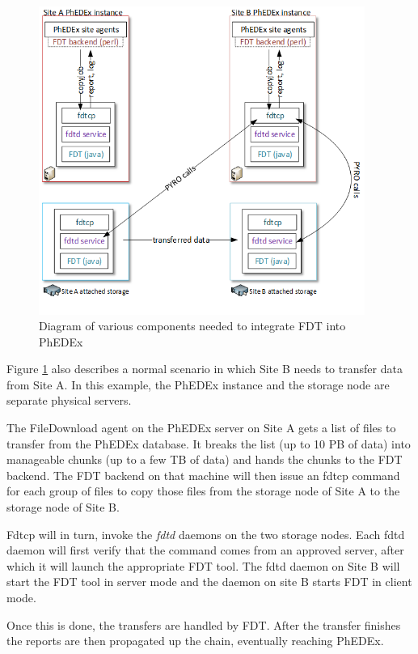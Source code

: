 \begin{figure}[h]
  \centering
  \includegraphics[width=0.95\textwidth]{Figures/PhEDEx-and-FDT-diagram.png}
  \caption{Diagram of various components needed to integrate FDT into PhEDEx}
  \label{fig:PhEDEx-FDT-arch}
\end{figure} 

Figure \ref{fig:PhEDEx-FDT-arch} also describes a normal scenario in which Site B
needs to transfer data from Site A. In this example, the PhEDEx instance and the
storage node are separate physical servers. 

The FileDownload agent on the PhEDEx server on Site A gets a list of files to
transfer from the PhEDEx database. It breaks the list (up to 10 PB of data) into
manageable chunks (up to a few TB of data) and
hands the chunks to the FDT backend. The FDT backend on that machine will then issue an fdtcp
command for each group of files to copy those files from the storage node of
Site A to the storage node of Site B.

Fdtcp will in turn, invoke the \emph{fdtd} daemons on the two storage nodes. Each fdtd
daemon will first verify that the command comes from an approved server, after
which it will launch the appropriate FDT tool. The fdtd daemon on Site B
will start the FDT tool in server mode and the daemon on site B starts FDT in 
client mode.

Once this is done, the transfers are handled by FDT. After the transfer finishes
the reports are then propagated up the chain, eventually reaching PhEDEx.

